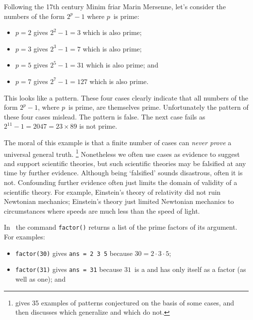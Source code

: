 \begin{draft}
\begin{example}
Following the 17th century Minim friar Marin Mersenne, let's consider the numbers of the form \(2^p-1\) where \(p\)~is prime:
\begin{itemize}
\item \(p=2\) gives \(2^2-1=3\) which is also prime;
\item \(p=3\) gives \(2^3-1=7\) which is also prime;
\item \(p=5\) gives \(2^5-1=31\) which is also prime; and
\item \(p=7\) gives \(2^7-1=127\) which is also prime.
\end{itemize}
This looks like a pattern.
These four cases clearly indicate that all numbers of the form \(2^p-1\), where \(p\)~is prime, are themselves prime.
Unfortunately the pattern of these four cases mislead. 
The pattern is false.
The next case fails as \(2^{11}-1= 2047 =23\times 89\) is not prime.
\end{example}


The moral of this example is that a finite number of cases can \emph{never prove} a universal general truth.
\footnote{\cite{Guy88} gives 35 examples of patterns conjectured on the basis of some cases, and then discusses which generalize and which do not.}
Nonetheless we often use cases as evidence to suggest and support scientific theories, but such scientific theories may be falsified at any time by further evidence.
Although being `falsified' sounds disastrous, often it is not.
Confounding further evidence often just limits the domain of validity of a scientific theory.
For example, Einstein's theory of relativity did not ruin Newtonian mechanics; Einstein's theory just limited Newtonian mechanics to circumstances where speeds are much less than the speed of light.




\begin{example} 
In \script\ the command \verb|factor()| returns a list of the prime factors of its  argument.  
For examples: 
\begin{itemize}
\item \verb|factor(30)| gives \verb|ans = 2 3 5| because \(30=2\cdot3\cdot 5\);

\item \verb|factor(31)| gives \verb|ans = 31| because \(31\)~is a  and has only itself as a factor (as well as one); and


\end{itemize}
\end{example}
\end{draft}
